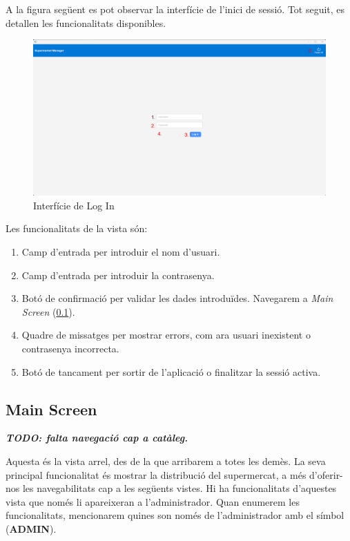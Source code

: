 \documentclass[a4paper,12pt]{article}
\begin{document}
	A la figura següent es pot observar la interfície de l'inici de sessió. Tot seguit, es detallen les funcionalitats disponibles.
	
	\begin{figure}[H] 
		\centering
		\includegraphics[width=0.75\linewidth]{assets/login.png}
		\caption{Interfície de Log In}
	\end{figure}
	
	\noindent Les funcionalitats de la vista són:
	
	\begin{enumerate}[itemsep=0pt, topsep=0pt]
		\item Camp d'entrada per introduir el nom d'usuari.
		\item Camp d'entrada per introduir la contrasenya.
		\item Botó de confirmació per validar les dades introduïdes. Navegarem a \textit{Main Screen} (\ref{sec:mainScreen}).
		\item Quadre de missatges per mostrar errors, com ara usuari inexistent o contrasenya incorrecta.
		\item Botó de tancament per sortir de l'aplicació o finalitzar la sessió activa.
	\end{enumerate}
	
	\newpage
	\subsection{Main Screen}
	\label{sec:mainScreen}
	
	\textbf{\textit{TODO: falta navegació cap a catàleg.}}
	
	Aquesta és la vista arrel, des de la que arribarem a totes les demès. La seva principal funcionalitat és mostrar la distribució del supermercat, a més d'oferir-nos les navegabilitats cap a les següents vistes. Hi ha funcionalitats d'aquestes vista que només li apareixeran a l'administrador. Quan enumerem les funcionalitats, mencionarem quines son només de l'administrador amb el símbol (\textbf{ADMIN}).
	
\end{document}
